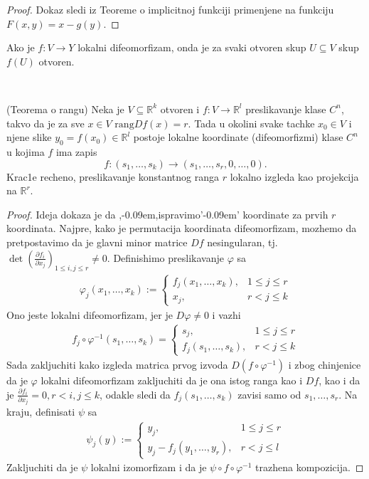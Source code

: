 \documentclass[a4paper,12pt]{article}
\newcommand{\R}{\mathbb{R}}
\newcommand{\psj}{\subseteq}
\newcommand{\rang}{\mathrm{rang}}
\def\zn{,\kern-0.09em,} %
\def\zng{'\kern-0.09em' } %
\begin{document}
\begin{proof}
Dokaz sledi iz Teoreme o implicitnoj funkciji primenjene na funkciju $F(x,y) = x - g(y)$.
\end{proof}

\begin{posl}
	Ako je $f:V\to Y$ lokalni difeomorfizam, onda je za svaki otvoren skup $U\psj V$ skup $f(U)$ otvoren.
\end{posl}\\

\begin{tma}(Teorema o rangu) Neka je $V \subseteq \R^k$ otvoren i $f: V \to \R^l$ preslikavanje klase $C^n$, takvo da je za sve $x \in V$ $\rang Df(x) = r$. Tada u okolini svake tachke $x_0 \in V$ i njene slike $y_0 = f(x_0) \in \R^l$ postoje lokalne koordinate (difeomorfizmi) klase $C^n$ u kojima $f$ ima zapis \[f: (s_1, \dots , s_k) \to (s_1, \dots, s_r, 0, \dots , 0).\]
Krac1e recheno, preslikavanje konstantnog ranga $r$ lokalno izgleda kao projekcija na $\R^r$.
\end{tma}
\begin{proof}
	Ideja dokaza je da \zn ispravimo\zng koordinate za prvih $r$ koordinata.
	Najpre, kako je permutacija koordinata difeomorfizam, mozhemo da pretpostavimo da je 
	glavni minor matrice $Df$ nesingularan, tj. $\det \left( \frac{\partial f_i}{\partial x_j}\right)_{1\leq i, j \leq r} \neq 0$.
	Definishimo preslikavanje $\varphi$ sa 
	\begin{align*}
		\varphi_j (x_1, \dotso, x_k):= 
		\begin{cases}
			f_j(x_1, \dotso, x_k), &1\leq j \leq r \\
			x_j, &r<j\leq k
		\end{cases}
	\end{align*}
	Ono jeste lokalni difeomorfizam, jer je $D\varphi \neq 0$ i vazhi 
	\begin{align*}
		f_j\circ \varphi^{-1}(s_1,\dotso, s_k) = 
		\begin{cases}
			s_j, &1 \leq j \leq r \\ 
			f_j(s_1, \dotso , s_k), &r < j \leq k
		\end{cases}
	\end{align*}
	Sada zakljuchiti kako izgleda matrica prvog izvoda $D(f\circ \varphi^{-1})$ i zbog chinjenice da je $\varphi$ lokalni
	difeomorfizam zakljuchiti da je ona istog ranga kao i $Df$, kao i da je $\frac{\partial f_i}{\partial x_j}= 0,r< i, j \leq k$,
	odakle sledi da $f_j(s_1, \dotso , s_k)$ zavisi samo od $s_1,\dotso, s_r$. Na kraju, definisati $\psi$ sa 
	\begin{align*}
		\psi_j (y):= 
		\begin{cases}
			y_j, &1\leq j \leq r \\
			y_j - f_j(y_1,\dotso, y_r), &r<j\leq l
		\end{cases}
	\end{align*}
	Zakljuchiti da je $\psi$ lokalni izomorfizam i da je $\psi\circ f\circ \varphi^{-1}$ trazhena kompozicija.

\end{proof}
\end{document}
